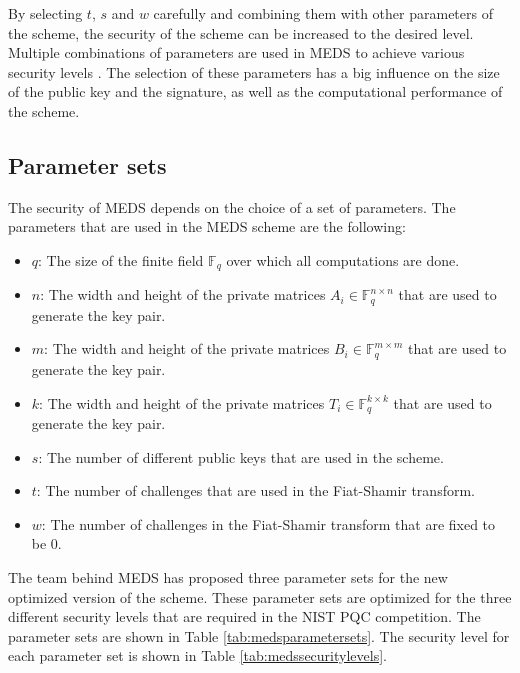 \documentclass[11pt,a4paper]{report}
\theoremstyle{definition}
\begin{document}
By selecting $t$, $s$ and $w$ carefully and combining them with other parameters of the scheme, the security of the scheme can be increased to the desired level. Multiple combinations of parameters are used in MEDS to achieve various security levels \cite{chou2023meds}. The selection of these parameters has a big influence on the size of the public key and the signature, as well as the computational performance of the scheme.

\subsection{Parameter sets}
\label{sec:parametersets}
The security of MEDS depends on the choice of a set of parameters. The parameters that are used in the MEDS scheme are the following:
\begin{itemize}
  \item $q$: The size of the finite field $\mathbb{F}_q$ over which all computations are done.
  \item $n$: The width and height of the private matrices $A_i \in \mathbb{F}_q^{n \times n}$ that are used to generate the key pair.
  \item $m$: The width and height of the private matrices $B_i \in \mathbb{F}_q^{m \times m}$ that are used to generate the key pair.
  \item $k$: The width and height of the private matrices $T_i \in \mathbb{F}_q^{k \times k}$ that are used to generate the key pair.
  \item $s$: The number of different public keys that are used in the scheme.
  \item $t$: The number of challenges that are used in the Fiat-Shamir transform.
  \item $w$: The number of challenges in the Fiat-Shamir transform that are fixed to be 0.
\end{itemize}

The team behind MEDS has proposed three parameter sets for the new optimized version of the scheme. These parameter sets are optimized for the three different security levels that are required in the NIST PQC competition. The parameter sets are shown in Table \ref{tab:medsparametersets}. The security level for each parameter set is shown in Table \ref{tab:medssecuritylevels}.
\end{document}
